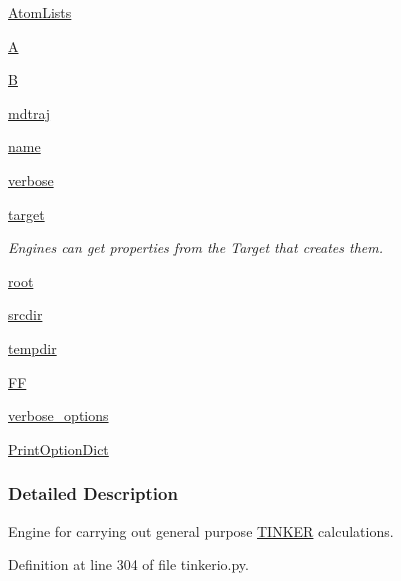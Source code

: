 \begin{DoxyCompactItemize}
\hyperlink{classforcebalance_1_1tinkerio_1_1TINKER_a7cc6fc75f1b433c724d4be094109b2e6}{Atom\-Lists}
\item 
\hyperlink{classforcebalance_1_1tinkerio_1_1TINKER_abffae1bbf80b2ef21aedb60fe2be2bbe}{A}
\item 
\hyperlink{classforcebalance_1_1tinkerio_1_1TINKER_a28d1166b702fd00583368dd019bbf67a}{B}
\item 
\hyperlink{classforcebalance_1_1tinkerio_1_1TINKER_af0d4fd73fd056064753d80ad55e5be8d}{mdtraj}
\item 
\hyperlink{classforcebalance_1_1engine_1_1Engine_add3a4bf15527832034d88fb692a37115}{name}
\item 
\hyperlink{classforcebalance_1_1engine_1_1Engine_a29b97ebf8984e50fd19eb831715ab659}{verbose}
\item 
\hyperlink{classforcebalance_1_1engine_1_1Engine_a1fdd29fbd127cba331326a3557558e2a}{target}
\begin{DoxyCompactList}\small\item\em Engines can get properties from the Target that creates them. \end{DoxyCompactList}\item 
\hyperlink{classforcebalance_1_1engine_1_1Engine_a82e9382a3316d3e26ef29efb58db4a00}{root}
\item 
\hyperlink{classforcebalance_1_1engine_1_1Engine_ad9c499329de6299f0b8acf898d71e7d5}{srcdir}
\item 
\hyperlink{classforcebalance_1_1engine_1_1Engine_a7bb2deae7ee926f0df7758a92b382515}{tempdir}
\item 
\hyperlink{classforcebalance_1_1engine_1_1Engine_aeb55142568e89f7a92d745e04ec3c964}{F\-F}
\item 
\hyperlink{classforcebalance_1_1BaseClass_afd68efa29ccd2f320f4cf82198214aac}{verbose\-\_\-options}
\item 
\hyperlink{classforcebalance_1_1BaseClass_afc6659278497d7245bc492ecf405ccae}{Print\-Option\-Dict}
\end{DoxyCompactItemize}


\subsubsection{Detailed Description}
Engine for carrying out general purpose \hyperlink{classforcebalance_1_1tinkerio_1_1TINKER}{T\-I\-N\-K\-E\-R} calculations. 



Definition at line 304 of file tinkerio.\-py.



